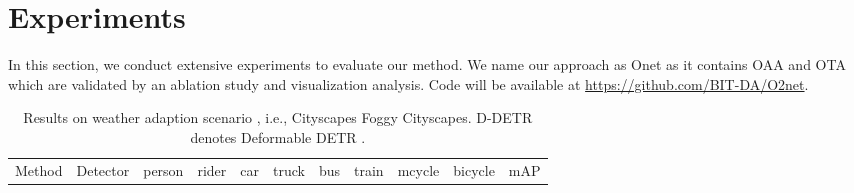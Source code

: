 \documentclass[sigconf]{acmart}
\begin{document}
\section{Experiments}
In this section, we conduct extensive experiments to evaluate our method. We name our approach as Onet as it contains OAA and OTA which are validated by an ablation study and visualization analysis. Code will be available at \url{https://github.com/BIT-DA/O2net}.




\begin{table*}[t]
\centering
            \small
            \caption{Results on weather adaption scenario , i.e., Cityscapes  Foggy Cityscapes. D-DETR denotes Deformable DETR \cite{zhu2020deformable}.} 
            \label{tab:foggy}
            \setlength{\tabcolsep}{3.2mm}
            \begin{tabular}{c|c|cccccccc|c}
                \toprule[1.0pt]
                Method & Detector & person & rider & car & truck & bus & train & mcycle & bicycle & mAP \\
            

\end{tabular}
\end{table*}
\end{document}
